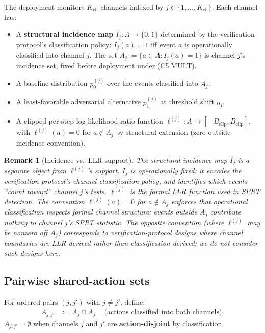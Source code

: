 \documentclass{article}
\newtheorem{remark}{Remark}
\newcommand{\Bclip}{B_{\mathrm{clip}}}
\newcommand{\Kch}{K_{\mathrm{ch}}}
\begin{document}
The deployment monitors $\Kch$ channels indexed by $j \in \{1,
\ldots, \Kch\}$.  Each channel has:
\begin{itemize}
\item A \textbf{structural incidence map} $I_j: A \to \{0, 1\}$
  determined by the verification protocol's classification policy:
  $I_j(a) = 1$ iff event $a$ is operationally classified into
  channel $j$.  The set $A_j := \{a \in A : I_j(a) = 1\}$ is
  channel $j$'s incidence set, fixed before deployment under
  (C5.MULT).
\item A baseline distribution $p_0^{(j)}$ over the events
  classified into $A_j$.
\item A least-favorable adversarial alternative $p_1^{(j)}$ at
  threshold shift $\eta_j$.
\item A clipped per-step log-likelihood-ratio function
  $\ell^{(j)}: A \to [-\Bclip, \Bclip]$, with $\ell^{(j)}(a) = 0$
  for $a \notin A_j$ by structural extension (zero-outside-incidence
  convention).
\end{itemize}

\begin{remark}[Incidence vs.\ LLR support]
\label{rem:incidence}
The structural incidence map $I_j$ is a separate object from
$\ell^{(j)}$'s support.  $I_j$ is \emph{operationally} fixed: it
encodes the verification protocol's channel-classification policy,
and identifies which events ``count toward'' channel $j$'s tests.
$\ell^{(j)}$ is the formal LLR function used in SPRT detection.
The convention $\ell^{(j)}(a) = 0$ for $a \notin A_j$ enforces that
operational classification respects formal channel structure: events
outside $A_j$ contribute nothing to channel $j$'s SPRT statistic.
The opposite convention (where $\ell^{(j)}$ may be nonzero off
$A_j$) corresponds to verification-protocol designs where channel
boundaries are LLR-derived rather than classification-derived; we do
not consider such designs here.
\end{remark}

\subsection{Pairwise shared-action sets}

For ordered pairs $(j, j')$ with $j \neq j'$, define:
\begin{align}
  A_{j, j'} &:= A_j \cap A_{j'} \quad \text{(actions classified into
    both channels)}.
\end{align}
$A_{j, j'} = \emptyset$ when channels $j$ and $j'$ are
\textbf{action-disjoint} by classification.
\end{document}
